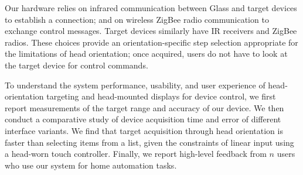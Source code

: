 Our hardware relies on infrared communication between Glass and target devices to establish a connection; and on wireless ZigBee radio communication to exchange control messages.  Target devices similarly have IR receivers and ZigBee radios. These choices provide an orientation-specific  step selection appropriate for the limitations of head orientation; once acquired, users do not have to look at the target device for control commands.

To understand the system performance, usability, and user experience of head-orientation targeting and head-mounted displays for device control, we first report measurements of the target range and accuracy of our device. We then conduct a comparative study of device acquisition time and error of different interface variants. We find that target acquisition through head orientation is faster than selecting items from a list, given the constraints of linear input using a head-worn touch controller. Finally, we report high-level feedback from $n$ users who use our system for home automation tasks.



